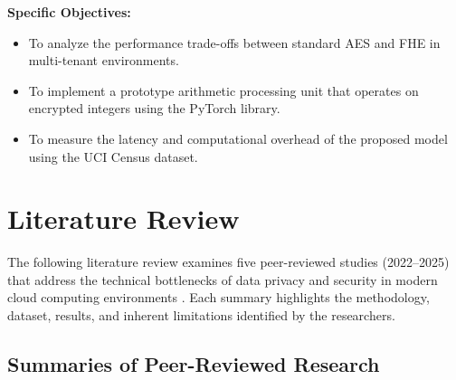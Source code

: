 \documentclass[12pt, a4paper]{article}
\begin{document}
\textbf{Specific Objectives:}
\begin{itemize}
    \item To analyze the performance trade-offs between standard AES and FHE in multi-tenant environments.
    \item To implement a prototype arithmetic processing unit that operates on encrypted integers using the PyTorch library.
    \item To measure the latency and computational overhead of the proposed model using the UCI Census dataset.
\end{itemize}

\section{Literature Review}

The following literature review examines five peer-reviewed studies (2022--2025) that address the technical bottlenecks of data privacy and security in modern cloud computing environments \cite{alshamrani2019iotsecurity, bhushan2022cloudsecurity}. Each summary highlights the methodology, dataset, results, and inherent limitations identified by the researchers.

\subsection{Summaries of Peer-Reviewed Research}
\end{document}
